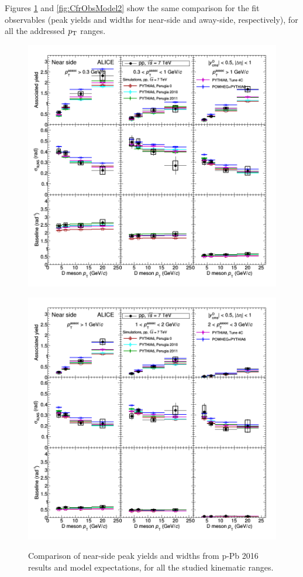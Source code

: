 Figures \ref{fig:CfrObsModel} and \ref{fig:CfrObsModel2} show the same comparison for the fit observables (peak yields and widths for near-side and away-side, respectively), for all the addressed $p_{\rm T}$ ranges.

\begin{figure}[!htbp]
\centering
{\includegraphics[width=1.1\textwidth, angle=90]{figures/CfrPPandModels/ComparePPtoMCFitResults.png}}
\end{figure}
\begin{figure}[!htbp]
\centering
{\includegraphics[width=1.1\textwidth, angle=90]{figures/CfrPPandModels/ComparePPtoMCFitResults_2.png}}
\caption{Comparison of near-side peak yields and widths from p-Pb 2016 results and model expectations, for all the studied kinematic ranges.}
\label{fig:CfrObsModel}
\end{figure}

